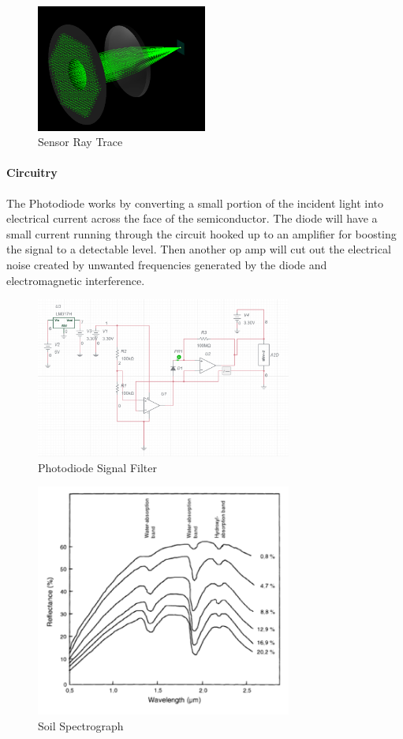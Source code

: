 \begin{figure}[H]
    \caption{Sensor Ray Trace}
    \centering
    \includegraphics[width=0.5\textwidth]{images/ColimatedBeam.png}
\end{figure}


\paragraph{Circuitry} The Photodiode works by converting a small portion of the incident light into electrical current across the face of the semiconductor. The diode will have a small current running through the circuit hooked up to an amplifier for boosting the signal to a detectable level. Then another op amp will cut out the electrical noise created by unwanted frequencies generated by the diode and electromagnetic interference.

\begin{figure}[H]
    \caption{Photodiode Signal Filter}
    \centering
    \includegraphics[width=0.75\textwidth]{images/ElectricalSignalFilteringSD1.png}
\end{figure}

\begin{figure}[H]
    \caption{Soil Spectrograph}
    \centering
    \includegraphics[width=0.75\textwidth]{images/GenericSoilSpectra.png}
\end{figure}

